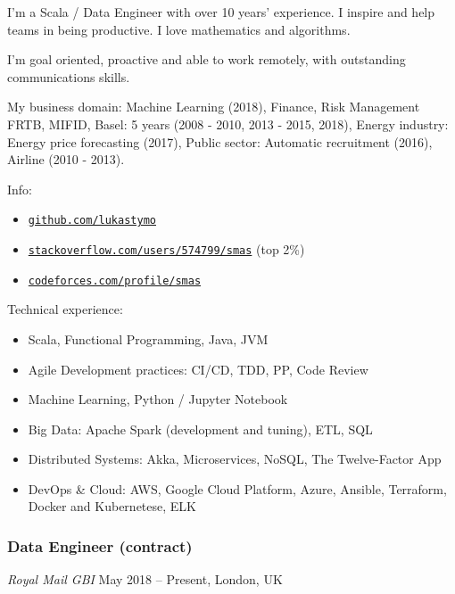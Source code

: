 \documentclass[]{rss}
\date{}
\providecommand{\tightlist}{%
  \setlength{\itemsep}{0pt}\setlength{\parskip}{0pt}}
\begin{document}
\address{\\[-9pt] lukas@codeily.com | lukastymo.com}
\begin{resume}

I'm a Scala / Data Engineer with over 10 years' experience. I inspire
and help teams in being productive. I love mathematics and algorithms.

I'm goal oriented, proactive and able to work remotely, with outstanding
communications skills.

My business domain: Machine Learning (2018), Finance, Risk Management
FRTB, MIFID, Basel: 5 years (2008 - 2010, 2013 - 2015, 2018), Energy
industry: Energy price forecasting (2017), Public sector: Automatic
recruitment (2016), Airline (2010 - 2013).

Info:

\begin{itemize}
\tightlist
\item
  \href{https://github.com/lukastymo}{\texttt{github.com/lukastymo}}
\item
  \href{https://stackoverflow.com/users/574799/smas}{\texttt{stackoverflow.com/users/574799/smas}}
  (top 2\%)
\item
  \href{https://codeforces.com/profile/smas}{\texttt{codeforces.com/profile/smas}}
\end{itemize}

Technical experience:

\begin{itemize}
\tightlist
\item
  Scala, Functional Programming, Java, JVM
\item
  Agile Development practices: CI/CD, TDD, PP, Code Review
\item
  Machine Learning, Python / Jupyter Notebook
\item
  Big Data: Apache Spark (development and tuning), ETL, SQL
\item
  Distributed Systems: Akka, Microservices, NoSQL, The Twelve-Factor App
\item
  DevOps \& Cloud: AWS, Google Cloud Platform, Azure, Ansible,
  Terraform, Docker and Kubernetese, ELK
\end{itemize}

\subsubsection{Data Engineer (contract)}\label{data-engineer-contract}

\emph{Royal Mail \textbar{} GBI} May 2018 -- Present, London, UK


\end{resume}
\end{document}
